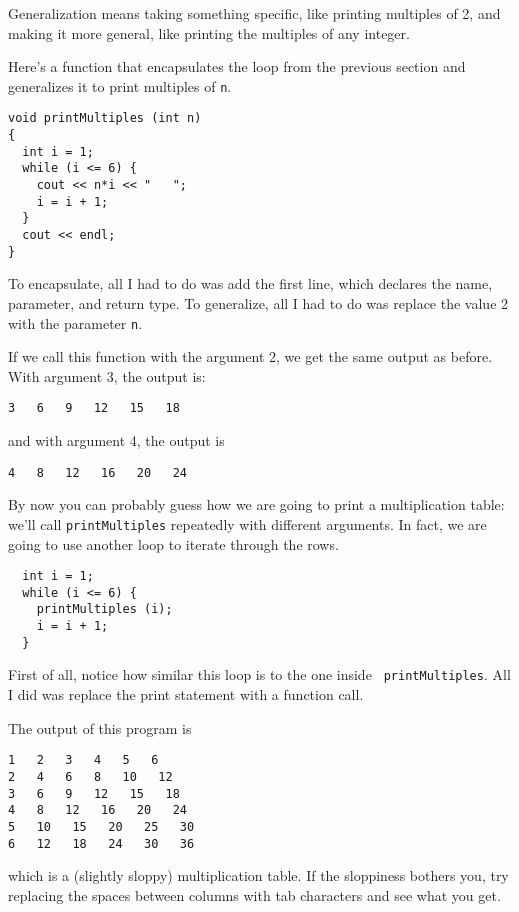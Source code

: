Generalization means taking something specific, like printing
multiples of 2, and making it more general, like printing the
multiples of any integer.


Here's a function that encapsulates the loop from the previous
section and generalizes it to print multiples of {\tt n}.

\begin{verbatim}
void printMultiples (int n)
{
  int i = 1;
  while (i <= 6) {
    cout << n*i << "   ";
    i = i + 1;
  }
  cout << endl;
}
\end{verbatim}
%
To encapsulate, all I had to do was add the first line,
which declares the name, parameter,
and return type.  To generalize, all I had to do was replace
the value 2 with the parameter {\tt n}.

If we call this function with the argument 2, we get the same
output as before.  With argument 3, the output is:

\begin{verbatim}
3   6   9   12   15   18
\end{verbatim}
%
and with argument 4, the output is

\begin{verbatim}
4   8   12   16   20   24 
\end{verbatim}
%
By now you can probably guess how we are going to print a
multiplication table: we'll call {\tt printMultiples} repeatedly with
different arguments.  In fact, we are going to use another loop to
iterate through the rows.

\begin{verbatim}
  int i = 1;
  while (i <= 6) {
    printMultiples (i);
    i = i + 1;
  }    
\end{verbatim}
%
First of all, notice how similar this loop is to the one inside {\tt
printMultiples}.  All I did was replace the print statement with a
function call.

The output of this program is

\begin{verbatim}
1   2   3   4   5   6   
2   4   6   8   10   12   
3   6   9   12   15   18   
4   8   12   16   20   24   
5   10   15   20   25   30   
6   12   18   24   30   36   
\end{verbatim}
%
which is a (slightly sloppy) multiplication table.  If the
sloppiness bothers you, try replacing the spaces between
columns with tab characters and see what you get.

